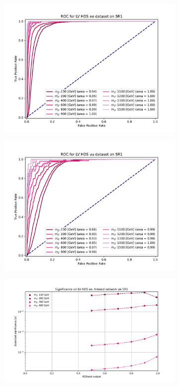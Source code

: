 \documentclass[12pt, a4paper]{book}
\begin{document}
\begin{figure}[!ht]
   \begin{subfigure}[b]{0.49\textwidth}
      \centering
      \includegraphics[width=1\textwidth]{XGBoost/Model_independent/50-100/LV_HDS/ROC_ee.pdf}
   \end{subfigure}
   \hfill
   \begin{subfigure}[b]{0.49\textwidth}
      \centering
      \includegraphics[width=1\textwidth]{XGBoost/Model_independent/50-100/LV_HDS/ROC_uu.pdf}
   \end{subfigure}
   \hfill
	\begin{subfigure}[b]{0.49\textwidth}
      \centering
      \includegraphics[width=1\textwidth]{XGBoost/Model_independent/50-100/LV_HDS/EXP_SIG_ee.pdf}

\end{subfigure}
\end{figure}
\end{document}

